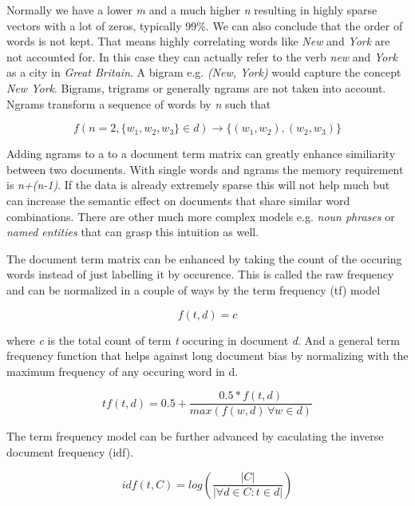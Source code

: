     Normally we have a lower \emph{m} and a much higher \emph{n} resulting in highly sparse vectors with a lot of zeros, typically 99\%. We can also conclude that the order of words is not kept. That means highly correlating words like \emph{New} and \emph{York} are not accounted for. In this case they can actually refer to the verb \emph{new} and \emph{York} as a city in \emph{Great Britain}. A bigram e.g. \emph{(New, York)} would capture the concept \emph{New York}. Bigrams, trigrams or generally ngrams are not taken into account. Ngrams transform a sequence of words by \emph{n} such that 

      \begin{equation}
        f(n = 2, \{w_1, w_2, w_3\} \in d) \to \{(w_1, w_2),(w_2,w_3)\}
      \end{equation}

    Adding ngrams to a to a document term matrix can greatly enhance similiarity between two documents. With single words and ngrams the memory requirement is \emph{n+(n-1)}. If the data is already extremely sparse this will not help much but can increase the semantic effect on documents that share similar word combinations. There are other much more complex models e.g. \emph{noun phrases} or \emph{named entities} that can grasp this intuition as well.

    The document term matrix can be enhanced by taking the count of the occuring words instead of just labelling it by occurence. This is called the raw frequency and can be normalized in a couple of ways by the term frequency (tf) model
     
      \begin{equation}
        f(t,d) = c
      \end{equation}

    where \emph{c} is the total count of term \emph{t} occuring in document \emph{d}.
    And a general term frequency function that helps against long document bias by normalizing with the maximum frequency of any occuring word in d.

    \begin{equation}
      tf(t,d) = 0.5 + \frac{0.5 * f(t,d)}{max(f(w,d)\, \forall w \in d)}
    \end{equation}

    The term frequency model can be further advanced by caculating the inverse document frequency (idf).

    \begin{equation}
      idf(t, C) = log(\frac{|C|}{|\forall d \in C : t \in d|})
    \end{equation}

